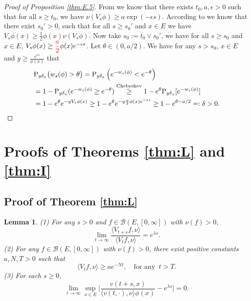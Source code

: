 \documentclass[12pt,a4paper]{amsart}
\numberwithin{equation}{section}
\theoremstyle{plain}
\newtheorem{lem}[thm]{Lemma}
\theoremstyle{definition}
\theoremstyle{remark}
\begin{document}
\begin{proof}[Proof of Proposition \ref{thm:E.5}]
	From \cite[(3.20)]{LiuRenSongSun2020} we know that there exists $t_0,a,\epsilon>0$ such that for all $s\geq t_0$, we have $\nu(V_{s}\phi) \geq a \exp(-\epsilon s)$.
	According to \cite[Proposition 2.2]{LiuRenSongSun2020} we know that there exist $s_0'>0$, such that for all $s\geq s_0'$ and $x\in E$ we have $V_{s}\phi(x)\ge\frac{1}{2}\phi(x)\nu(V_{s}\phi)$.
	Now take $s_0:= t_0 \vee s_0'$, we have for all $s\geq s_0$ and $x\in E$, $V_{s}\phi(x)\geq {\color{red}\dfrac{a}{2}}\phi(x)e^{-\epsilon s}$.
	Let $\theta \in (0,a/2)$.
	We have for any $s>s_0$, $x\in E$ and $y\geq \frac{e^{\epsilon s}}{\phi(x)}$ that
\begin{align}
	&\mathrm P_{y\delta_x}\big(w_s(\phi)>\theta\big)
	=\mathrm P_{y\delta_x}\left(e^{-w_s(\phi)}<e^{-\theta}\right)
	\\&=1-\mathrm P_{y\delta_x}(e^{-w_s(\phi)}\geq e^{-\theta})
	\overset{\text{Chebyshev}}\geq 1-e^{\theta}\mathrm P_{y\delta_x}[e^{- w_s(\phi)}]
	\\&=1-e^{\theta}e^{-yV_{s}\phi(x)}
	\geq 1-e^{\theta}e^{-y \frac{a}{2}\phi(x)e^{-\epsilon s}}
	\geq 1 - e^{\theta - a/2}=: \delta >0.
	\qedhere
\end{align}
\end{proof}



\section{Proofs of Theorems \ref{thm:L} and \ref{thm:I}}



\subsection{Proof of Theorem \ref{thm:L}}

\begin{lem}\label{lem:ratio limit}
	(1) For any $s>0$ and $f\in\mathcal B(E,[0,\infty])$ with $\nu(f)>0$, 
	\begin{equation}\label{integ ratio limit}
		\lim_{t\to\infty}\dfrac{\langle V_{t+s}f, \nu\rangle}{\langle V_{t}f, \nu\rangle}=e^{\lambda s}.
	\end{equation}
	(2)
		For any $f\in\mathcal B(E,[0,\infty])$ with $\nu(f)>0$, there exist positive constants $a,N,T>0$ such that
	\begin{equation}\label{inequ:lower}
		\langle V_{t}f, \nu\rangle\geq ae^{-Nt},\quad \mbox{for any }\ t>T.
	\end{equation}
	(3) For each $s\geq 0$,
	\begin{equation} \label{one point ratio limit}
		\lim_{t\to \infty} \sup_{x\in E}\Big|\frac{v(t+s,x)}{\langle v(t,\cdot),\nu\rangle\phi(x) } - e^{\lambda s} \Big|=0.
	\end{equation}
\end{lem}
\end{document}
